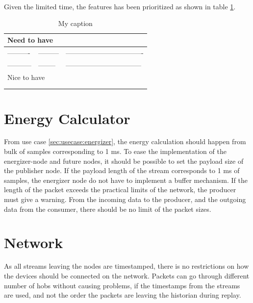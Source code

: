 
Given the limited time, the features has been prioritized as shown in table \ref{sec:analysis:historian:tablefeatures}.
\begin{table}[]
\centering
\caption{My caption}
\label{sec:analysis:historian:tablefeatures}
\begin{tabular}{l|l|l}

\multicolumn{3}{l}{Need to have}              \\ \hline
----------  & --------- & ---------------------------------- \\ \hline
----------- & --------  & --------------------------------- \\ \hline
\multicolumn{3}{l}{Nice to have}              \\ \hline
            &           &                       \\ \hline
            &           &                       \\ \hline
\end{tabular}
\end{table}

\section{Energy Calculator}
From use case \ref{sec:usecase:energizer}, the energy calculation should happen from bulk of samples corresponding to 1 ms. To ease the implementation of the energizer-node and future nodes, it should be possible to set the payload size of the publisher node. If the payload length of the stream corresponds to 1 ms of samples, the energizer node do not have to implement a buffer mechanism. If the length of the packet exceeds the practical limits of the network, the producer must give a warning. From the incoming data to the producer, and the outgoing data from the consumer, there should be no limit of the packet sizes.

\section{Network}
As all streams leaving the nodes are timestamped, there is no restrictions on how the devices should be connected on the network. Packets can go through different number of hobs without causing problems, if the timestamps from the streams are used, and not the order the packets are leaving the historian during replay.

